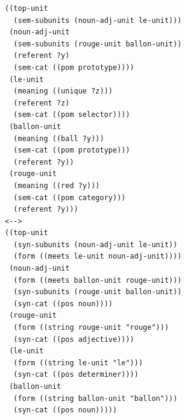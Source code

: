 \footnotesize
\begin{Verbatim}[frame=lines, label=Structure after application in interpretation]
((top-unit
  (sem-subunits (noun-adj-unit le-unit)))
 (noun-adj-unit
  (sem-subunits (rouge-unit ballon-unit))
  (referent ?y)
  (sem-cat ((pom prototype))))
 (le-unit
  (meaning ((unique ?z)))
  (referent ?z)
  (sem-cat ((pom selector))))
 (ballon-unit
  (meaning ((ball ?y)))
  (sem-cat ((pom prototype)))
  (referent ?y))
 (rouge-unit
  (meaning ((red ?y)))
  (sem-cat ((pom category)))
  (referent ?y)))
<-->
((top-unit 
  (syn-subunits (noun-adj-unit le-unit))
  (form ((meets le-unit noun-adj-unit))))
 (noun-adj-unit
  (form ((meets ballon-unit rouge-unit)))
  (syn-subunits (rouge-unit ballon-unit))
  (syn-cat ((pos noun))))
 (rouge-unit
  (form ((string rouge-unit "rouge")))
  (syn-cat ((pos adjective))))
 (le-unit 
  (form ((string le-unit "le"))) 
  (syn-cat ((pos determiner))))
 (ballon-unit
  (form ((string ballon-unit "ballon")))
  (syn-cat ((pos noun)))))
\end{Verbatim}
\normalsize
